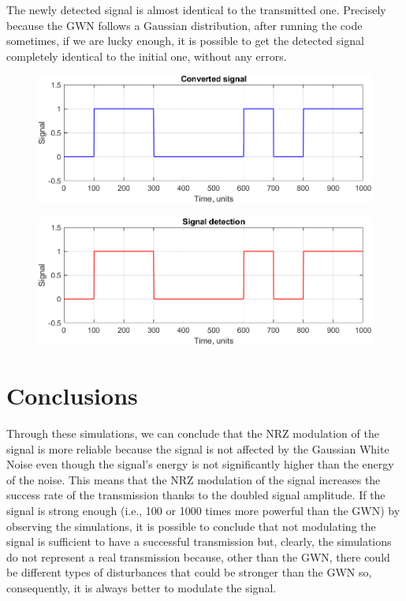\noindent The newly detected signal is almost identical to the transmitted one. Precisely because the GWN follows a Gaussian distribution, after running the code sometimes, if we are lucky enough, it is possible to get the detected signal completely identical to the initial one, without any errors.

\begin{figure}[h!]
    \centering
    \includegraphics[width = .6\textwidth]{lab-1/imgs/converted_signal.png}
\end{figure}

\begin{figure}[h!]
    \centering
    \includegraphics[width = .6\textwidth]{lab-1/imgs/NRZ_detection_SNR10_2.png}
\end{figure}

% 
% 
\section*{Conclusions}\label{conclusions}
Through these simulations, we can conclude that the NRZ modulation of the signal is more reliable because the signal is not affected by the Gaussian White Noise even though the signal's energy is not significantly higher than the energy of the noise. This means that the NRZ modulation of the signal increases the success rate of the transmission thanks to the doubled signal amplitude. If the signal is strong enough (i.e., 100 or 1000 times more powerful than the GWN) by observing the simulations, it is possible to conclude that not modulating the signal is sufficient to have a successful transmission but, clearly, the simulations do not represent a real transmission because, other than the GWN, there could be different types of disturbances that could be stronger than the GWN so, consequently, it is always better to modulate the signal. 



